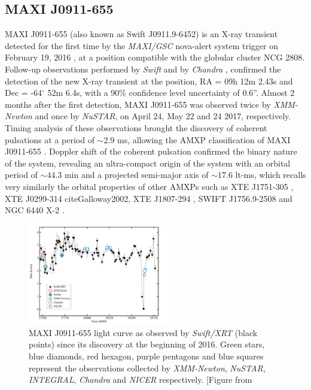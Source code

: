 \documentclass[graybox]{svmult}
\def \inte {{\em INTEGRAL\xspace}}
\def \swift {{\em Swift\xspace}}
\def \chandra {{\em Chandra\xspace}}
\def \xmm {{\em XMM-Newton\xspace}}
\def \swiftxrt{{\em Swift/XRT\xspace}}
\def \nustar{{\em NuSTAR\xspace}}
\def \nicer{{\em NICER\xspace}}
\def \maxigsc{{\em MAXI/GSC\xspace}}
\begin{document}
\subsection{MAXI J0911-655}

MAXI J0911-655 (also known as Swift J0911.9-6452) is an X-ray transient detected for the first time by the \maxigsc{} nova-alert system trigger on February 19, 2016 \cite{Serino2016}, at a position compatible with the globular cluster NCG 2808. Follow-up observations performed by \swift{} and by \chandra{} \cite{Homan2016}, confirmed the detection of the new X-ray transient at the position, RA = 09h 12m 2.43s and Dec = -64$^\circ$ 52m 6.4s, with a 90\% confidence level uncertainty of 0.6''. 
Almost 2 months after the first detection, MAXI J0911-655 was observed twice by \xmm{} and once by \nustar{}, on April 24, May 22 and 24 2017, respectively. Timing analysis of these observations brought the discovery of coherent pulsations at a period of $\sim$2.9 ms, allowing the AMXP classification of MAXI J0911-655 \cite{Sanna2017a}. Doppler shift of the coherent pulsation confirmed the binary nature of the system, revealing an ultra-compact origin of the system with an orbital period of $\sim44.3$ min and a projected semi-major axis of $\sim17.6$ lt-ms, which recalls very similarly the orbital properties of other AMXPs such as XTE J1751-305 \cite{Markwardt2002,Papitto2008}, XTE J0299-314 
cite{Galloway2002}, XTE J1807-294 \cite{Kirsch2004,Riggio2008,Chou2008,Patruno2010b}, SWIFT J1756.9-2508 \cite{Krimm2007,Linares2008b,Patruno2010b} and NGC 6440 X-2 \cite{Altamirano2010b,Bult2015c}.

\begin{figure}
\centering
  \includegraphics[width=0.55\textwidth]{REVIEW_AMXP/lc_updated_maxi_0911.pdf}
  \caption{MAXI J0911-655 light curve as observed by \swiftxrt{} (black points) since its discovery at the beginning of 2016. Green stars, blue diamonds, red hexagon, purple pentagons and blue squares represent the observations collected by \xmm{}, \nustar{}, \inte{}, \chandra{} and \nicer{} respectively. [Figure from \cite{Sanna2017a}}     
  \label{fig:lc_0911}
\end{figure}
\end{document}
